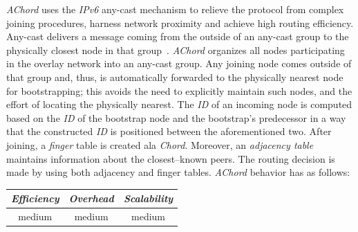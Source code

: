 \emph{AChord} \cite{DK2006} uses the {\sl IPv6} any-cast mechanism to
relieve the protocol from complex joining procedures,
harness network proximity and achieve high routing efficiency. 
Any-cast delivers a message coming from the outside of 
an any-cast group to the physically closest node in
that group~\cite{M2002}. 
\emph{AChord} organizes all nodes participating in the
overlay network into an any-cast group. 
Any joining node comes outside of that group and, thus, is
automatically forwarded to the physically nearest node for bootstrapping;
this avoids the need to explicitly maintain such nodes, %
and the effort of locating the physically nearest. 
The \emph{ID} of an incoming 
node is computed based on the \emph{ID} of the bootstrap node 
and the bootstrap's predecessor in a way that the constructed 
\emph{ID} is positioned between the aforementioned two. 
After joining, a \emph{finger} table is created ala \emph{Chord}. 
Moreover, an \emph{adjacency table} maintains 
information about the closest--known peers. 
The routing decision is made by using both adjacency and finger tables.
\emph{AChord} behavior has as follows:
\begin{center}
{\footnotesize
\begin{tabular}{ccc}
\emph{Efficiency} & \emph{Overhead} & \emph{Scalability} \\
\hline
medium &
medium &
medium
\end{tabular}
}
\end{center}

